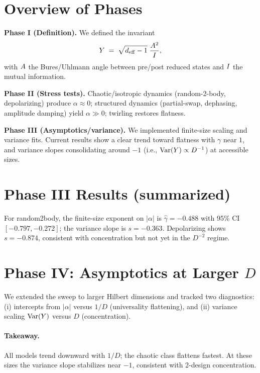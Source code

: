\section{Overview of Phases}
\textbf{Phase I (Definition).} We defined the invariant
\[
Y \;=\; \sqrt{d_{\mathrm{eff}}-1}\;\frac{A^2}{I},
\]
with $A$ the Bures/Uhlmann angle between pre/post reduced states and $I$ the mutual information.

\textbf{Phase II (Stress tests).} Chaotic/isotropic dynamics (random-2-body, depolarizing) produce $\alpha\!\approx\!0$; structured dynamics (partial-swap, dephasing, amplitude damping) yield $\alpha\!\gg\!0$; twirling restores flatness.

\textbf{Phase III (Asymptotics/variance).} We implemented finite-size scaling and variance fits. Current results show a clear trend toward flatness with $\gamma$ near $1$, and variance slopes consolidating around $-1$ (i.e., $\mathrm{Var}(Y)\propto D^{-1}$) at accessible sizes.

\section{Phase III Results (summarized)}
For random2body, the finite-size exponent on $|\alpha|$ is $\hat{\gamma}=-0.488$ with 95\% CI $[-0.797,-0.272]$; the variance slope is $s=-0.363$.
Depolarizing shows $s=-0.874$, consistent with concentration but not yet in the $D^{-2}$ regime.

\section{Phase IV: Asymptotics at Larger $D$}

We extended the sweep to larger Hilbert dimensions and tracked two diagnostics:
(i) intercepts from $|{\alpha}|$ versus $1/D$ (universality flattening),
and (ii) variance scaling $\mathrm{Var}(Y)$ versus $D$ (concentration).




\paragraph{Takeaway.} All models trend downward with $1/D$; the chaotic class flattens fastest. At these sizes the variance slope stabilizes near $-1$, consistent with 2-design concentration.

